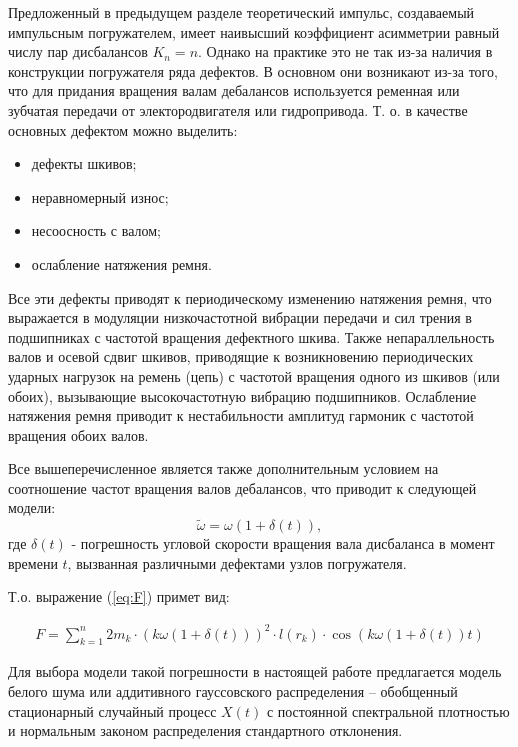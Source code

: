 Предложенный в предыдущем разделе теоретический импульс, создаваемый импульсным погружателем,
имеет наивысший коэффициент асимметрии равный числу пар дисбалансов $K_n = n$. Однако на практике это не так
из-за наличия в конструкции погружателя ряда дефектов. В основном они возникают из-за того, что для придания
вращения валам дебалансов используется ременная или зубчатая передачи от электородвигателя или гидропривода.
Т. о. в качестве основных дефектом можно выделить:
\begin{itemize}
    \item дефекты шкивов; 
    \item неравномерный износ;
    \item несоосность с валом;
    \item ослабление натяжения ремня.
\end{itemize}
Все эти дефекты приводят к периодическому изменению натяжения ремня, что выражается в модуляции низкочастотной
вибрации передачи и сил трения в подшипниках с частотой вращения дефектного шкива. Также непараллельность валов
и осевой сдвиг шкивов, приводящие к возникновению периодических ударных нагрузок на ремень (цепь) с частотой
вращения одного из шкивов (или обоих), вызывающие высокочастотную вибрацию подшипников. Ослабление натяжения
ремня приводит к нестабильности амплитуд гармоник с частотой вращения обоих валов.

Все вышеперечисленное является также дополнительным условием на соотношение частот вращения валов дебалансов,
что приводит к следующей модели:
\begin{equation}
    \widetilde{\omega} = \omega (1 + \delta(t)),
\end{equation}
где $\delta(t)$ - погрешность угловой скорости вращения вала дисбаланса в момент времени $t$,
вызванная различными дефектами узлов погружателя.

Т.о. выражение (\ref{eq:F}) примет вид:

\begin{equation}
    \label{eq:F_noise}
    \begin{gathered}
        F = \sum\limits_{k = 1}^n 2 m_k \cdot (k \omega (1 + \delta(t)))^2 \cdot l(r_k) \cdot \cos (k \omega (1 + \delta(t)) t)
    \end{gathered}
\end{equation}

Для выбора модели такой погрешности в настоящей работе предлагается модель белого шума или аддитивного
гауссовского распределения -- обобщенный стационарный случайный процесс $X(t)$ с постоянной спектральной
плотностью и нормальным законом распределения стандартного отклонения.

